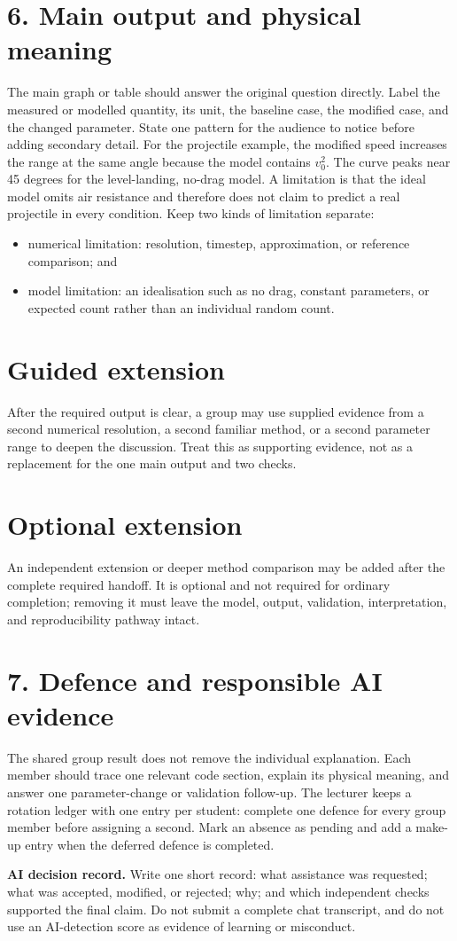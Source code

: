 \documentclass[11pt,a4paper]{article}
\begin{document}
\section*{6. Main output and physical meaning}
The main graph or table should answer the original question directly. Label the measured or modelled quantity, its unit, the baseline case, the modified case, and the changed parameter. State one pattern for the audience to notice before adding secondary detail.
For the projectile example, the modified speed increases the range at the same angle because the model contains $v_0^2$. The curve peaks near 45 degrees for the level-landing, no-drag model. A limitation is that the ideal model omits air resistance and therefore does not claim to predict a real projectile in every condition.
Keep two kinds of limitation separate:
\begin{itemize}[nosep,leftmargin=6mm]
\item numerical limitation: resolution, timestep, approximation, or reference comparison; and
\item model limitation: an idealisation such as no drag, constant parameters, or expected count rather than an individual random count.
\end{itemize}
\section*{Guided extension}
After the required output is clear, a group may use supplied evidence from a second numerical resolution, a second familiar method, or a second parameter range to deepen the discussion. Treat this as supporting evidence, not as a replacement for the one main output and two checks.
\section*{Optional extension}
An independent extension or deeper method comparison may be added after the complete required handoff. It is optional and not required for ordinary completion; removing it must leave the model, output, validation, interpretation, and reproducibility pathway intact.
\section*{7. Defence and responsible AI evidence}
The shared group result does not remove the individual explanation. Each member should trace one relevant code section, explain its physical meaning, and answer one parameter-change or validation follow-up. The lecturer keeps a rotation ledger with one entry per student: complete one defence for every group member before assigning a second. Mark an absence as pending and add a make-up entry when the deferred defence is completed.
\begin{aibox}\textbf{AI decision record.} Write one short record: what assistance was requested; what was accepted, modified, or rejected; why; and which independent checks supported the final claim. Do not submit a complete chat transcript, and do not use an AI-detection score as evidence of learning or misconduct.\end{aibox}
\end{document}
